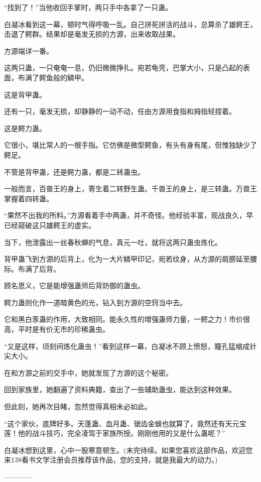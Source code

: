 \begin{this_body}
“找到了！”当他收回手掌时，两只手中各拿了一只蛊。

白凝冰看到这一幕，顿时气得呼吸一乱。自己拼死拼活的战斗，总算杀了雄鳄王，击退了鳄群。结果却是毫发无损的方源，出来收取战果。

方源端详一番。

这两只蛊，一只奄奄一息，仍旧微微挣扎。宛若龟壳，巴掌大小，只是凸起的表面，布满了鳄鱼般的鳞甲。

这是背甲蛊。

还有一只，毫发无损，却静静的一动不动，任由方源用食指和拇指轻捏着。

这是鳄力蛊。

它很小，堪比常人的一根手指。它仿佛是微型鳄鱼，有头有身有尾，但惟独缺少了鳄足。

不管是背甲蛊，还是鳄力蛊，都是二转蛊虫。

一般而言，百兽王的身上，寄生着二转野生蛊。千兽王的身上，是三转蛊。万兽王掌握着四转蛊。

“果然不出我的所料。”方源看着手中两蛊，并不奇怪。他经验丰富，观战良久，早已经窥破这只雄鳄王的虚实。

当下，他泄露出一丝春秋蝉的气息，真元一吐，就将这两只蛊虫炼化。

背甲蛊飞到方源的后背上，化为一大片鳞甲印记，宛若纹身，从方源的肩膀延至腰际。布满了后背。

顾名思义，它是能增强蛊师后背防御的蛊虫。

鳄力蛊则化作一道暗黄色的光，钻入到方源的空窍当中去。

它和黑白豕蛊的作用，大致相同。能永久性的增强蛊师力量，一鳄之力！市价很高，平时是有价无市的珍稀蛊虫。

“又是这样，顷刻间炼化蛊虫！”看到这样一幕，白凝冰不顾上愤怒，瞳孔猛缩成针尖大小。

在和方源之前的交手中，她就发现了方源的这个秘密。

回到家族里，她翻遍了资料典籍，查出了一些辅助蛊虫，能达到这种效果。

但此刻，她再次目睹，忽然觉得真相未必如此。

“这个家伙，底牌好多。天蓬蛊、血月蛊、锯齿金蜈也就算了，竟然还有天元宝莲！他的战斗技巧，完全凌驾于家族所授。刚刚他用的又是什么蛊呢？”

白凝冰想到这里，心中一股寒意顿生。(未完待续。如果您喜欢这部作品，欢迎您来138看书文学注册会员推荐该作品，您的支持，就是我最大的动力。)

------------

\end{this_body}

